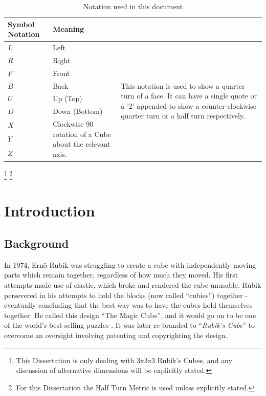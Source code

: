 \documentclass{report}
\begin{document}
	\begin{table}[htbp]
		\def\arraystretch{1.2}
		\centering
		\caption{Notation used in this document}
		\label{tab:table2}
		\begin{tabular}{m{}m{}m{}}
			\toprule
			\textbf{Symbol Notation} & \textbf{Meaning} \\
			\midrule
			$L$	&	Left			&	\multirow{9}{*}{\parbox{0.425\textwidth}{This notation is used to show a quarter turn of a face. It can have a single quote or a '2' appended to show a counter-clockwise quarter turn or a half turn respectively.}} \\
			$R$	&	Right			&	\\
			$F$	&	Front			&	\\
			$B$	&	Back			&	\\
			$U$	&	Up (Top)		&	\\
			$D$	&	Down (Bottom)	&	\\
			$X$ &	\multirow{ 3}{*}{\parbox{0.2\textwidth}{Clockwise 90\degree{} rotation of a Cube about the relevant axis.}} & \\
			$Y$ & & \\
			$Z$ & & \\
			\bottomrule
		\end{tabular}
	\end{table}
	\textcolor{white}{
		\footnote{\label{cube definition}This Dissertation is only dealing with 3x3x3 Rubik’s Cubes, and any discussion of alternative dimensions will be explicitly stated.}
		\footnote{\label{metric definition}For this Dissertation the Half Turn Metric is used unless explicitly stated.}		
	}



	\newpage
	\tableofcontents
	
	\newpage
	\chapter{Introduction}
    \section{Background}

    In 1974, Ern\"{o} Rubik was struggling to create a cube with independently moving parts which remain together, regardless of how much they moved. His first attempts made use of elastic, which broke and rendered the cube unusable. Rubik persevered in his attempts to hold the blocks (now called \enquote{cubies}) together - eventually concluding that the best way was to have the cubes hold themselves together. He called this design \enquote{The Magic Cube}, and it would go on to be one of the world's best-selling puzzles \cite{Waxman2014b}. It was later re-branded to \enquote{\textit{Rubik's Cube}} to overcome an oversight involving patenting and copyrighting  the design.
    
\end{document}

